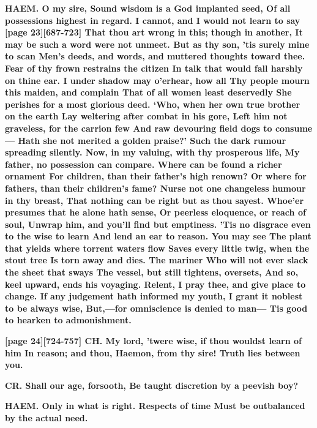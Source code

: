 \documentclass[11pt,letter]{book}
\begin{document}
\par \textbf{HAEM. O my sire, Sound wisdom is a God implanted seed, Of all possessions highest in regard. I cannot, and I would not learn to say [page 23][687-723] That thou art wrong in this; though in another, It may be such a word were not unmeet. But as thy son, ’tis surely mine to scan Men’s deeds, and words, and muttered thoughts toward thee. Fear of thy frown restrains the citizen In talk that would fall harshly on thine ear. I under shadow may o’erhear, how all Thy people mourn this maiden, and complain That of all women least deservedly She perishes for a most glorious deed. ‘Who, when her own true brother on the earth Lay weltering after combat in his gore, Left him not graveless, for the carrion few And raw devouring field dogs to consume— Hath she not merited a golden praise?’ Such the dark rumour spreading silently. Now, in my valuing, with thy prosperous life, My father, no possession can compare. Where can be found a richer ornament For children, than their father’s high renown? Or where for fathers, than their children’s fame? Nurse not one changeless humour in thy breast, That nothing can be right but as thou sayest. Whoe’er presumes that he alone hath sense, Or peerless eloquence, or reach of soul, Unwrap him, and you’ll find but emptiness. ’Tis no disgrace even to the wise to learn And lend an ear to reason. You may see The plant that yields where torrent waters flow Saves every little twig, when the stout tree Is torn away and dies. The mariner Who will not ever slack the sheet that sways The vessel, but still tightens, oversets, And so, keel upward, ends his voyaging. Relent, I pray thee, and give place to change. If any judgement hath informed my youth, I grant it noblest to be always wise, But,—for omniscience is denied to man— Tis good to hearken to admonishment.}
\par 

\par \textbf{[page 24][724-757] CH. My lord, ’twere wise, if thou wouldst learn of him In reason; and thou, Haemon, from thy sire! Truth lies between you.}
\par 

\par \textbf{CR. Shall our age, forsooth, Be taught discretion by a peevish boy?}
\par 

\par \textbf{HAEM. Only in what is right. Respects of time Must be outbalanced by the actual need.}
\par 
\end{document}
